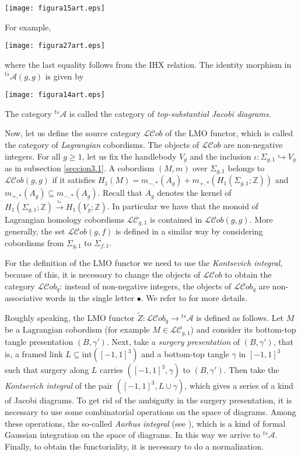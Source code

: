 \documentclass[10pt]{amsart}
\numberwithin{equation}{section}
\numberwithin{equation}{section}
\theoremstyle{definition}
\begin{document}
\centerline{\texttt{[image: figura15art.eps]}}

\noindent For example,

\centerline{\texttt{[image: figura27art.eps]}}

\medskip

\noindent where the last equality follows from the IHX relation. The identity morphism in ${}^{ts}\!\!\mathcal{A}(g,g)$ is given by

\centerline{\texttt{[image: figura14art.eps]}}

\noindent The category ${}^{ts}\!\!\mathcal{A}$ is called the category of \emph{top-substantial Jacobi diagrams}. 

Now, let us define the source category $\mathcal{LC}ob$ of the LMO functor, which is called the category of \emph{Lagrangian} cobordisms. The objects of  $\mathcal{LC}ob$ are non-negative integers. For all $g\geq1$, let us fix the handlebody $V_g$ and the inclusion $\iota:\Sigma_{g,1}\hookrightarrow V_g$ as in subsection \ref{seccion3.1}. A cobordism $(M,m)$ over $\Sigma_{g,1}$ belongs to $\mathcal{LC}ob(g,g)$ if it satisfies $H_1(M)=m_{-,*}(A_g)+m_{+,*}(H_1(\Sigma_{g,1};\mathbb{Z}))$ and  $m_{+,*}(A_g)\subseteq m_{-,*}(A_g)$. Recall that $A_g$ denotes the kernel of $H_1(\Sigma_{g,1};\mathbb{Z})\stackrel{\iota_*}{\longrightarrow}H_1(V_g;\mathbb{Z})$. In particular we have that the monoid of Lagrangian homology cobordisms $\mathcal{LC}_{g,1}$ is contained in $\mathcal{LC}ob(g,g)$. More generally, the set $\mathcal{LC}ob(g,f)$ is defined in a similar way  by considering cobordisms from $\Sigma_{g,1}$ to $\Sigma_{f,1}$.

For the definition of the LMO functor we need to use the \emph{Kontsevich integral}, because of this, it is necessary to change the objects of $\mathcal{LC}ob$ to obtain the category $\mathcal{LC}ob_q$: instead of non-negative integers, the objects of  $\mathcal{LC}ob_q$ are non-associative words in the single letter $\bullet$. We refer to \cite{MR2403806} for  more details.


Roughly speaking, the LMO functor $\widetilde{Z}:\mathcal{LC}ob_q\rightarrow {}^{ts}\!\!\mathcal{A}$ is defined as follows. Let $M$ be a Lagrangian cobordism (for example $M\in\mathcal{LC}_{g,1}$) and consider its  bottom-top tangle presentation $(B,\gamma')$. Next, take a \emph{surgery presentation} of $(B,\gamma')$, that is, a framed link $L\subseteq \text{int}([-1,1]^3)$ and a bottom-top tangle $\gamma$ in $[-1,1]^3$ such that surgery along $L$ carries $([-1,1]^3,\gamma)$ to $(B,\gamma')$. Then take the \emph{Kontsevich integral} of the pair $([-1,1]^3,L\cup\gamma)$, which gives a series of a kind of Jacobi diagrams. To get rid of the ambiguity in the surgery presentation, it is necessary to use some combinatorial operations on the space of diagrams. Among these operations, the so-called \emph{Aarhus integral} (see \cite{MR1931167,MR1931168}), which is a kind of formal Gaussian integration on the space of diagrams. In this way we arrive  to ${}^{ts}\!\!\mathcal{A}$. Finally, to obtain the functoriality, it is necessary to do a normalization. 
\end{document}
